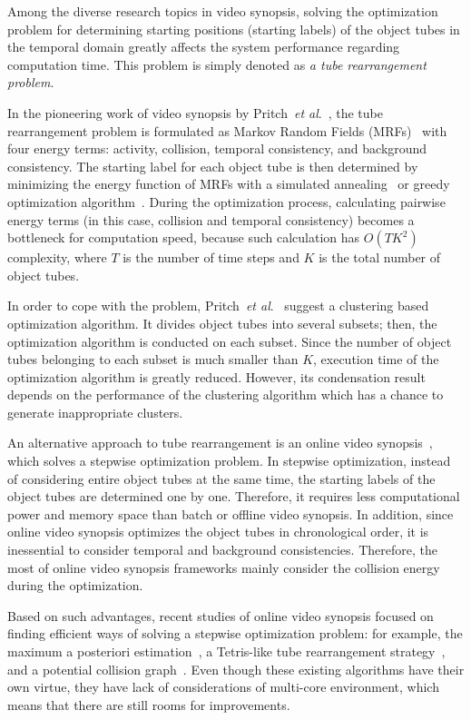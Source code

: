 \documentclass[11pt]{hyu_thesis}
\newcommand{\etal}{\textit{et al}.}
\begin{document}
Among the diverse research topics in video synopsis, solving the optimization problem for determining starting positions (starting labels) of the object tubes in the temporal domain greatly affects the system performance regarding computation time. This problem is simply denoted as \textit{a tube rearrangement problem}.

In the pioneering work of video synopsis by Pritch~\etal~\cite{Pritch2008}, the tube rearrangement problem is formulated as Markov Random Fields (MRFs)~\cite{Kolmogorov2004} with four energy terms: activity, collision, temporal consistency, and background consistency. The starting label for each object tube is then determined by minimizing the energy function of MRFs with a simulated annealing~\cite{Kirkpatrick1983} or greedy optimization algorithm~\cite{Cormen2009}. During the optimization process, calculating pairwise energy terms (in this case, collision and temporal consistency) becomes a bottleneck for computation speed, because such calculation has $O(TK^2)$ complexity, where $T$ is the number of time steps and $K$ is the total number of object tubes.

In order to cope with the problem, Pritch~\etal~\cite{Pritch2009} suggest
a clustering based optimization algorithm. It divides object tubes into several subsets; then, the optimization algorithm is conducted on each subset. Since the number of object tubes belonging to each subset is much smaller than $K$, execution time of the optimization algorithm is greatly reduced. However, its condensation result depends on the performance of the clustering algorithm which has a chance to
generate inappropriate clusters.

An alternative approach to tube rearrangement is an online video synopsis~\cite{Huang2014,ShikunFeng2012,JianqingZhu2015,He2017,Fu2014}, which solves a stepwise optimization problem. In stepwise optimization, instead of considering entire object tubes at the same time, the starting labels of the object tubes are determined one by one. Therefore, it requires less computational power and memory space than batch or offline video synopsis. In addition, since online video synopsis optimizes the object tubes in chronological order, it is inessential to consider temporal and background consistencies. Therefore, the most of online video synopsis frameworks mainly consider the collision energy during the optimization.

Based on such advantages, recent studies of online video synopsis focused on finding efficient ways of solving a stepwise optimization problem: for example, the maximum a posteriori estimation~\cite{Huang2014}, a Tetris-like tube rearrangement strategy~\cite{ShikunFeng2012,JianqingZhu2015}, and a potential collision graph~\cite{He2017}. 
Even though these existing algorithms have their own virtue, they have lack of considerations of multi-core environment, which means that there are still rooms for improvements.
\end{document}
